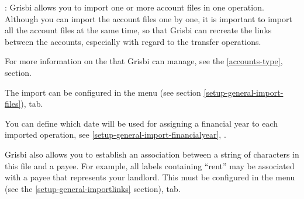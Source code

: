 \Note{}: Grisbi allows you to import one or more account files in one operation. Although you can import the account files one by one, it is important to import all the account files at the same time, so that Grisbi can recreate the links between the accounts, especially with regard to the transfer operations.

For more information on the  that Grisbi can manage, see the \vref{accounts-type},  section.

The import can be configured in the menu  (see section \vref{setup-general-import-files}),  tab.

You can define which date will be used for assigning a financial year to each imported operation, see \vref{setup-general-import-financialyear}, .

Grisbi also allows you to establish an association between a string of characters in this file and a payee. For example, all labels containing \enquote{rent} may be associated with a payee that represents your landlord. This must be configured in the  menu (see the \vref{setup-general-importlinks} section),  tab.

